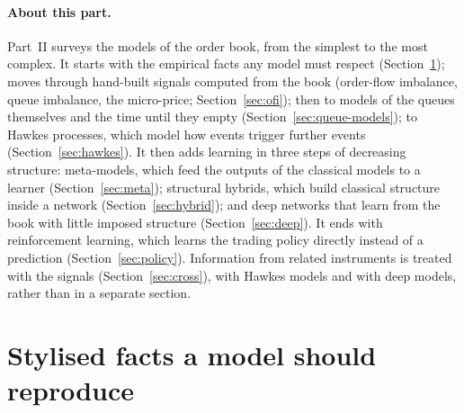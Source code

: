 \paragraph{About this part.} Part~II surveys the models of the order book, from the simplest to the
most complex. It starts with the empirical facts any model must respect (Section~\ref{sec:facts});
moves through hand-built signals computed from the book (order-flow imbalance, queue imbalance, the
micro-price; Section~\ref{sec:ofi}); then to models of the queues themselves and the time until they
empty (Section~\ref{sec:queue-models}); to Hawkes processes, which model how events trigger further
events (Section~\ref{sec:hawkes}). It then adds learning in three steps of decreasing structure:
meta-models, which feed the outputs of the classical models to a learner (Section~\ref{sec:meta});
structural hybrids, which build classical structure inside a network (Section~\ref{sec:hybrid}); and deep
networks that learn from the book with little imposed structure (Section~\ref{sec:deep}). It ends with reinforcement learning, which learns the trading
policy directly instead of a prediction (Section~\ref{sec:policy}). Information from
related instruments is treated with the signals (Section~\ref{sec:cross}), with Hawkes models and with deep models,
rather than in a separate section.

\section{Stylised facts a model should reproduce}
\label{sec:facts}

